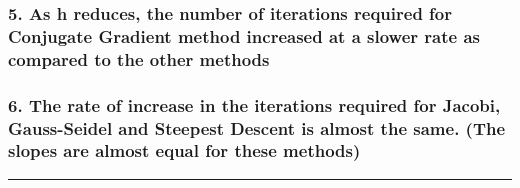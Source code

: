 \documentclass[11pt]{article}
\begin{document}
    \hypertarget{as-h-reduces-the-number-of-iterations-required-for-conjugate-gradient-method-increased-at-a-slower-rate-as-compared-to-the-other-methods}{%
\subsubsection{5. As h reduces, the number of iterations required for
Conjugate Gradient method increased at a slower rate as compared to the
other
methods}\label{as-h-reduces-the-number-of-iterations-required-for-conjugate-gradient-method-increased-at-a-slower-rate-as-compared-to-the-other-methods}}

    \hypertarget{the-rate-of-increase-in-the-iterations-required-for-jacobi-gauss-seidel-and-steepest-descent-is-almost-the-same.-the-slopes-are-almost-equal-for-these-methods}{%
\subsubsection{6. The rate of increase in the iterations required for
Jacobi, Gauss-Seidel and Steepest Descent is almost the same. (The
slopes are almost equal for these
methods)}\label{the-rate-of-increase-in-the-iterations-required-for-jacobi-gauss-seidel-and-steepest-descent-is-almost-the-same.-the-slopes-are-almost-equal-for-these-methods}}

    \begin{center}\rule{0.5\linewidth}{0.5pt}\end{center}


    
    
    
\end{document}
